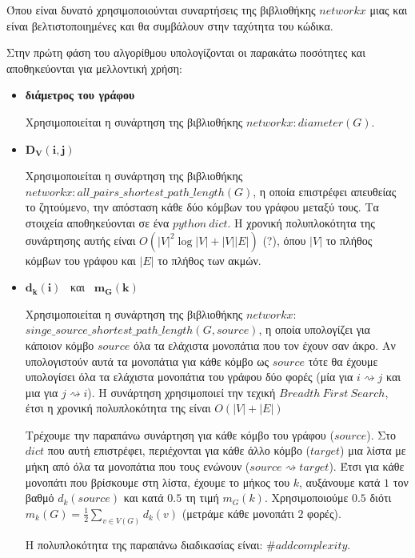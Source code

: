 \documentclass[12pt, letterpaper]{article}
\begin{document}
Όπου είναι δυνατό χρησιμοποιούνται συναρτήσεις της βιβλιοθήκης $networkx$ μιας και 
είναι βελτιστοποιημένες και θα συμβάλουν στην ταχύτητα του κώδικα.

Στην πρώτη φάση του αλγορίθμου υπολογίζονται οι παρακάτω ποσότητες και αποθηκεύονται
για μελλοντική χρήση:
\begin{itemize}
    \item \textbf{διάμετρος του γράφου } 
    
    Χρησιμοποιείται η συνάρτηση της βιβλιοθήκης $networkx: diameter(G)$.
    
    \item  $\mathbf{D_V(i,j)}$
    
    Χρησιμοποιείται η συνάρτηση της βιβλιοθήκης $networkx: all\_pairs\_shortest\_path\_length(G)$,
    η οποία επιστρέφει απευθείας το ζητούμενο, την απόσταση κάθε δύο κόμβων του γράφου
    μεταξύ τους. Τα στοιχεία αποθηκεύονται σε ένα $python \ dict$. Η χρονική
    πολυπλοκότητα της συνάρτησης αυτής είναι $O(|V|^2\log |V| +|V||E|)$ (?), όπου 
    $|V|$ το πλήθος κόμβων του γράφου και $|E|$ το πλήθος των ακμών. 


    \item  $\mathbf{d_k(i)}$ \ και \ $\mathbf{m_G(k)}$
    
    Χρησιμοποιείται η συνάρτηση της βιβλιοθήκης $networkx:$ \\
    $ singe\_source\_shortest\_path\_length(G,source)$, η οποία υπολογίζει για κάποιον
    κόμβο $source$ όλα τα ελάχιστα μονοπάτια που τον έχουν σαν άκρο. Αν υπολογιστούν 
    αυτά τα μονοπάτια για κάθε κόμβο ως $source$ τότε θα έχουμε υπολογίσει
    όλα τα ελάχιστα μονοπάτια του γράφου δύο φορές (μία για $i \rightsquigarrow j$ και 
    μια για $j \rightsquigarrow i$). Η συνάρτηση χρησιμοποιεί την τεχική 
    $Breadth \ First \ Search$, έτσι η χρονική πολυπλοκότητα της είναι 
    $O(|V|+|E|)$

    Τρέχουμε την παραπάνω συνάρτηση για κάθε κόμβο του γράφου ($source$). Στο $dict$ που 
    αυτή επιστρέφει, περιέχονται για κάθε άλλο κόμβο  ($target$) μια λίστα με μήκη από όλα
    τα μονοπάτια που τους ενώνουν ($source \rightsquigarrow target$). Έτσι για κάθε 
    μονοπάτι που βρίσκουμε στη λίστα, έχουμε το μήκος του $k$, 
    αυξάνουμε κατά $1$ τον βαθμό $d_k(source)$ και κατά $0.5$ τη τιμή 
    $m_G(k)$. Χρησιμοποιούμε $0.5$ διότι $m_k(G) = \frac{1}{2} \sum_{v \in V (G)} d_k(v)$
    (μετράμε κάθε μονοπάτι $2$ φορές).

    Η  πολυπλοκότητα της παραπάνω διαδικασίας είναι: $\#add complexity$.


\end{itemize}
\end{document}
